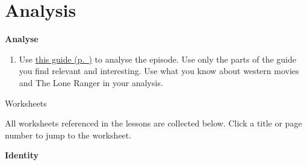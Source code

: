 \documentclass[11pt,a4paper,oneside]{book}
\newcommand{\tasktitle}[1]{{\color{blue}\bfseries #1}\par\smallskip}
\begin{document}
\section*{Analysis}
\begin{taskbox}
\tasktitle{Analyse}
\begin{enumerate}
\item Use \hyperref[note-how-to-analyse]{this guide (p.~\pageref*{note-how-to-analyse})} to analyse the episode. Use only the parts of the guide you find relevant and interesting. Use what you know about western movies and The Lone Ranger in your analysis.
\end{enumerate}
\end{taskbox}

\clearpage{}

\clearpage{}
{\displayfont\color{navy}\fontsize{30}{34}\selectfont Worksheets\par}\vspace{6mm}
All worksheets referenced in the lessons are collected below. Click a title or page number to jump to the worksheet.\par
\tasktitle{Identity}
\end{document}
